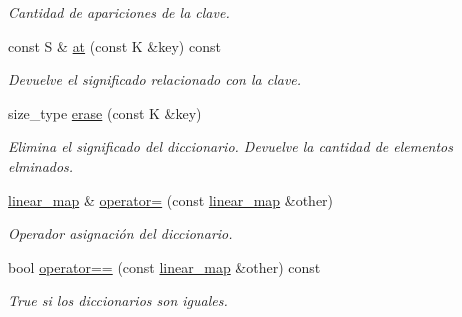 \begin{DoxyCompactItemize}
\begin{DoxyCompactList}\small\item\em Cantidad de apariciones de la clave. \end{DoxyCompactList}\item 
const S \& \hyperlink{classlinear__map_a7bbfefc3467a2f178c069b3958e81c8a}{at} (const K \&key) const 
\begin{DoxyCompactList}\small\item\em Devuelve el significado relacionado con la clave. \end{DoxyCompactList}\item 
size\-\_\-type \hyperlink{classlinear__map_a932198aa420701fb84af74434764be9d}{erase} (const K \&key)
\begin{DoxyCompactList}\small\item\em Elimina el significado del diccionario. Devuelve la cantidad de elementos elminados. \end{DoxyCompactList}\item 
\hyperlink{classlinear__map}{linear\-\_\-map} \& \hyperlink{classlinear__map_a9868e2ada8b775c57521506fe7dd24a7}{operator=} (const \hyperlink{classlinear__map}{linear\-\_\-map} \&other)
\begin{DoxyCompactList}\small\item\em Operador asignación del diccionario. \end{DoxyCompactList}\item 
bool \hyperlink{classlinear__map_aba00da27993faf7b3bf2b2e42203afbf}{operator==} (const \hyperlink{classlinear__map}{linear\-\_\-map} \&other) const 
\begin{DoxyCompactList}\small\item\em True si los diccionarios son iguales. \end{DoxyCompactList}\end{DoxyCompactItemize}
